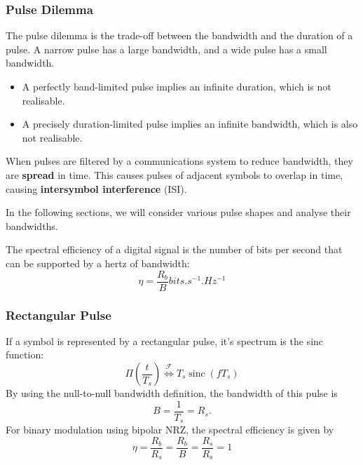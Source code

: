 \documentclass{article}
\DeclareMathOperator{\sinc}{sinc}
\begin{document}
\subsubsection{Pulse Dilemma}
The pulse dilemma is the trade-off between the bandwidth and the
duration of a pulse. A narrow pulse has a large bandwidth, and a wide
pulse has a small bandwidth.
\begin{itemize}
    \item A perfectly band-limited pulse implies an infinite duration,
          which is not realisable.
    \item A precisely duration-limited pulse implies an infinite
          bandwidth, which is also not realisable.
\end{itemize}
When pulses are filtered by a communications system to reduce bandwidth,
they are \textbf{spread} in time. This causes pulses of adjacent
symbols to overlap in time, causing \textbf{intersymbol interference}
(ISI).

In the following sections, we will consider various pulse shapes and
analyse their bandwidths.
\begin{definition}
    The spectral efficiency of a digital signal is the number of bits per
    second that can be supported by a hertz of bandwidth:
    \begin{equation*}
        \eta = \frac{R_b}{B} \unit{bits.s^{-1}.Hz^{-1}}
    \end{equation*}
\end{definition}
\subsubsection{Rectangular Pulse}
If a symbol is represented by a rectangular pulse, it's spectrum is the
sinc function:
\begin{equation*}
    \Pi\left( \frac{t}{T_s} \right) \overset{\mathscr{F}}{\iff} T_s \sinc{\left( f T_s \right)}
\end{equation*}
By using the null-to-null bandwidth definition, the bandwidth of this
pulse is
\begin{equation*}
    B = \frac{1}{T_s} = R_s.
\end{equation*}
For binary modulation using bipolar NRZ, the spectral efficiency is
given by
\begin{equation*}
    \eta = \frac{R_b}{R_s} = \frac{R_b}{B} = \frac{R_s}{R_s} = 1
\end{equation*}
\end{document}
